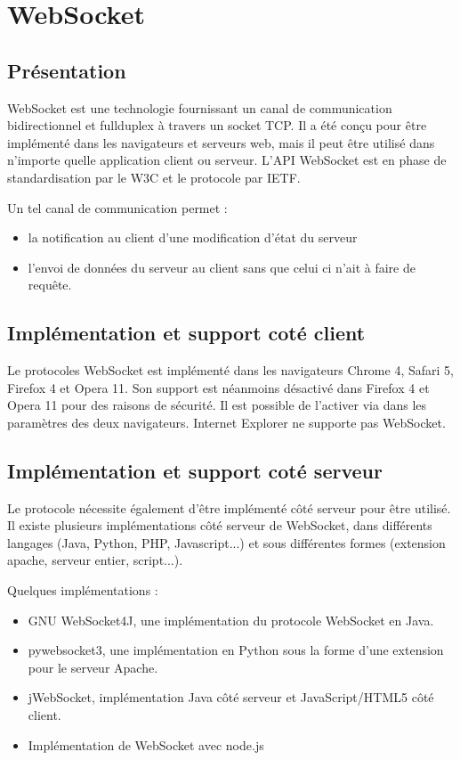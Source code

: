 \documentclass[a4paper,10pt]{report}
\begin{document}
  \section{WebSocket}

    \subsection{Présentation}

WebSocket est une technologie fournissant un canal de communication bidirectionnel 
et fullduplex à travers un socket TCP. Il a été conçu pour être implémenté dans 
les navigateurs et serveurs web, mais il peut être utilisé dans n'importe quelle 
application client ou serveur. L'API WebSocket est en phase de standardisation 
par le W3C et le protocole par IETF.

Un tel canal de communication permet :

\begin{itemize}
  \item la notification au client d'une modification d'état du serveur
  \item l'envoi de données du serveur au client sans que celui ci n'ait à faire de requête.
\end{itemize}

    \subsection{Implémentation et support coté client}

Le protocoles WebSocket est implémenté dans les navigateurs Chrome 4, Safari 5, 
Firefox 4 et Opera 11. Son support est néanmoins désactivé dans Firefox 4 et 
Opera 11 pour des raisons de sécurité. Il est possible de l'activer via dans les 
paramètres des deux navigateurs. Internet Explorer ne supporte pas WebSocket.


    \subsection{Implémentation et support coté serveur}

Le protocole nécessite également d'être implémenté côté serveur pour être 
utilisé. Il existe plusieurs implémentations côté serveur de WebSocket, 
dans différents langages (Java, Python, PHP, Javascript...) et sous 
différentes formes (extension apache, serveur entier, script...).

Quelques implémentations :

\begin{itemize}
  \item GNU WebSocket4J, une implémentation du protocole WebSocket en Java. 
  \item pywebsocket3, une implémentation en Python sous la forme d'une extension pour le serveur Apache.
  \item jWebSocket, implémentation Java côté serveur et JavaScript/HTML5 côté client.
  \item Implémentation de WebSocket avec node.js
\end{itemize}
\end{document}
